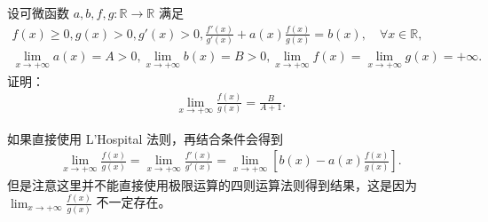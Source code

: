 \documentclass[../../main.tex]{subfiles}%
\begin{document}
\begin{example}
设可微函数 \(a, b, f, g : \mathbb{R} \to \mathbb{R}\) 满足
\begin{align*}
f(x) \geqslant 0, g(x) > 0, g'(x) > 0, \frac{f'(x)}{g'(x)} + a(x) \frac{f(x)}{g(x)} = b(x), \quad \forall x \in \mathbb{R}, \\
\lim_{x \to +\infty} a(x) = A > 0, \lim_{x \to +\infty} b(x) = B > 0, \lim_{x \to +\infty} f(x) = \lim_{x \to +\infty} g(x) = +\infty.
\end{align*}
证明：
\begin{align*}
\lim_{x \to +\infty} \frac{f(x)}{g(x)} = \frac{B}{A + 1}.
\end{align*} 
\end{example}
\begin{remark}
如果直接使用 L'Hospital 法则，再结合条件会得到
\begin{align*}
\lim_{x \to +\infty} \frac{f(x)}{g(x)} = \lim_{x \to +\infty} \frac{f'(x)}{g'(x)} = \lim_{x \to +\infty} \left[ b(x) - a(x) \frac{f(x)}{g(x)} \right].
\end{align*}
但是注意这里并不能直接使用极限运算的四则运算法则得到结果，这是因为 \(\lim_{x \to +\infty} \frac{f(x)}{g(x)}\) 不一定存在。 
\end{remark}
\end{document}

